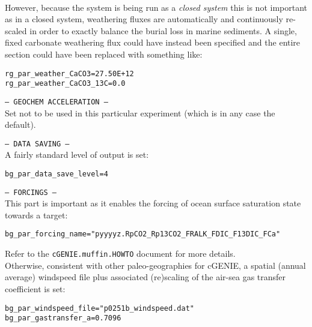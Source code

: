 \documentclass[10pt,twoside]{article}
\begin{document}
\begin{compactitem}
\\ However, because the system is being run as a \textit{closed system} this is not important as in a closed system, weathering fluxes are automatically and continuously re-scaled in order to exactly balance the burial loss in marine sediments. A single, fixed carbonate weathering flux could have instead been specified and the entire section could have been replaced with something like:
\vspace{-5pt}\begin{verbatim}
rg_par_weather_CaCO3=27.50E+12
rg_par_weather_CaCO3_13C=0.0
                \end{verbatim}\vspace{-5pt}
                \item \texttt{--- GEOCHEM ACCELERATION ---}
                \\ Set not to be used in this particular experiment (which is in any case the default).
                \item \texttt{--- DATA SAVING ---}
                \\ A fairly standard level of output is set:
\vspace{-5pt}\begin{verbatim}
bg_par_data_save_level=4
                \end{verbatim}\vspace{-5pt}
                \item \texttt{--- FORCINGS ---}
                \\ This part is important as it enables the forcing of ocean surface saturation state towards a target:
\vspace{-5pt}\begin{verbatim}
bg_par_forcing_name="pyyyyz.RpCO2_Rp13CO2_FRALK_FDIC_F13DIC_FCa"
                \end{verbatim}\vspace{-5pt}
 Refer to the \texttt{cGENIE.muffin.HOWTO} document for more details.
                \\ Otherwise, consistent with other paleo-geographies for cGENIE, a spatial (annual average) windspeed file plus associated (re)scaling of the air-sea gas transfer coefficient is set:
\vspace{-5pt}\begin{verbatim}
bg_par_windspeed_file="p0251b_windspeed.dat"
bg_par_gastransfer_a=0.7096
                \end{verbatim}\vspace{-5pt}
        \end{compactitem}
        
\end{document}
